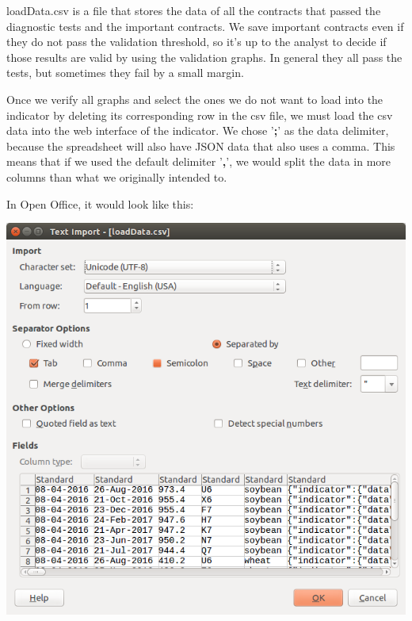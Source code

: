 \documentclass[10pt,a4paper]{book}
\begin{document}

loadData.csv is a file that stores the data of all the contracts that passed the diagnostic tests and the important contracts. We save important contracts even if they do not pass the validation threshold, so it's up to the analyst to decide if those results are valid by using the validation graphs. In general they all pass the tests, but sometimes they fail by a small margin.

Once we verify all graphs and select the ones we do not want to load into the indicator by deleting its corresponding row in the csv file, we must load the csv data into the web interface of the indicator. We chose '\textbf{;}' as the data delimiter, because the spreadsheet will also have JSON data that also uses a comma. This means that if we used the default delimiter '\textbf{,}', we would split the data in more columns than what we originally intended to.

In Open Office, it would look like this:

\begin{center}
  \includegraphics[scale=0.40]{images/delimiter}
\end{center}
\end{document}
